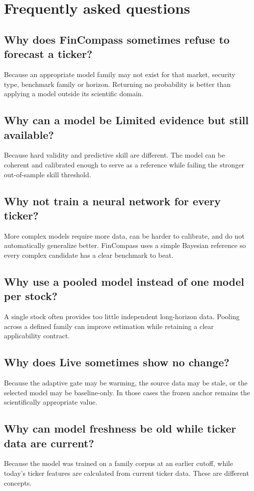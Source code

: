 \documentclass[11pt]{article}
\begin{document}
\section{Frequently asked questions}
\subsection{Why does FinCompass sometimes refuse to forecast a ticker?}
Because an appropriate model family may not exist for that market, security type, benchmark family or horizon. Returning no probability is better than applying a model outside its scientific domain.

\subsection{Why can a model be Limited evidence but still available?}
Because hard validity and predictive skill are different. The model can be coherent and calibrated enough to serve as a reference while failing the stronger out-of-sample skill threshold.

\subsection{Why not train a neural network for every ticker?}
More complex models require more data, can be harder to calibrate, and do not automatically generalize better. FinCompass uses a simple Bayesian reference so every complex candidate has a clear benchmark to beat.

\subsection{Why use a pooled model instead of one model per stock?}
A single stock often provides too little independent long-horizon data. Pooling across a defined family can improve estimation while retaining a clear applicability contract.

\subsection{Why does Live sometimes show no change?}
Because the adaptive gate may be warming, the source data may be stale, or the selected model may be baseline-only. In those cases the frozen anchor remains the scientifically appropriate value.

\subsection{Why can model freshness be old while ticker data are current?}
Because the model was trained on a family corpus at an earlier cutoff, while today's ticker features are calculated from current ticker data. These are different concepts.
\end{document}
